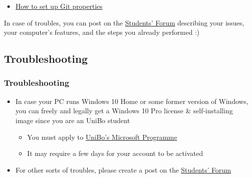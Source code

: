 \documentclass[handout]{beamer}\mode<presentation>{\usetheme{AMSCesenaBleu}}
\begin{document}
\begin{frame}
\begin{itemize}
		\item \href{https://git-scm.com/book/en/v2/Customizing-Git-Git-Configuration}{How to set up Git properties}
	\end{itemize}

	\begin{block}{}
		In case of troubles, you can post on the \href{https://iol.unibo.it/mod/forum/view.php?id=123707}{Students' Forum} \alert{describing your issues}, your computer's features, and the steps you already performed :)
	\end{block}

\end{frame}

\subsection{Troubleshooting}

\begin{frame}\label{troubleshooting}
\frametitle{Troubleshooting} 
	\begin{itemize}
		\item In case your PC runs Windows 10 Home or some former version of Windows, you can freely and legally get a Windows 10 Pro license \& self-installing image since you are an UniBo student
		\begin{itemize}
			\item You must apply to \href{https://dreamspark.campusfc.unibo.it/}{UniBo's Microsoft Programme}
			\item It may require a few days for your account to be activated 
		\end{itemize}
	
		\vspace{.3cm}
	
		\item For other sorts of troubles, please create a post on the \href{https://iol.unibo.it/mod/forum/view.php?id=123707}{Students' Forum}
		
	\end{itemize}
\end{frame}

\maketitle

\end{document}
